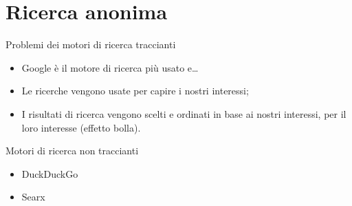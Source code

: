 
\section{Ricerca anonima}

\begin{myframe}{Problemi dei motori di ricerca traccianti}
  \begin{itemize}[<+->]
    \item Google è il motore di ricerca più usato e\dots{}
    \item Le ricerche vengono usate per capire i nostri interessi;
    \item I risultati di ricerca vengono scelti e ordinati in base ai nostri interessi, per il loro interesse (effetto bolla).
  \end{itemize}
\end{myframe}

\begin{myframe}{Motori di ricerca non traccianti}
  \begin{itemize}
    \item DuckDuckGo
    \item Searx
  \end{itemize}
\end{myframe}



